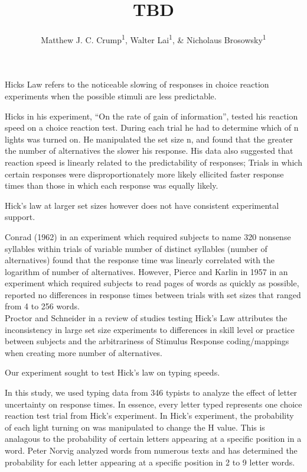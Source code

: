 \documentclass[man]{apa6}
\title{TBD}
\author{Matthew J. C. Crump\textsuperscript{1}, Walter Lai\textsuperscript{1}, \& Nicholaus Brosowsky\textsuperscript{1}}
\affiliation{
    \vspace{0.5cm}
          \textsuperscript{1} Brooklyn College of the City University of New York  }
\theoremstyle{definition}
\theoremstyle{definition}
\theoremstyle{definition}
\theoremstyle{remark}
\begin{document}
\maketitle

\setcounter{secnumdepth}{0}



Hicks Law refers to the noticeable slowing of responses in choice
reaction experiments when the possible stimuli are less predictable.

Hicks in his experiment, \enquote{On the rate of gain of information},
tested his reaction speed on a choice reaction test. During each trial
he had to determine which of n lights was turned on. He manipulated the
set size n, and found that the greater the number of alternatives the
slower his response. His data also suggested that reaction speed is
linearly related to the predictability of responses; Trials in which
certain responses were disproportionately more likely ellicited faster
response times than those in which each response was equally likely.

Hick's law at larger set sizes however does not have consistent
experimental support.

Conrad (1962) in an experiment which required subjects to name 320
nonsense syllables within trials of variable number of distinct
syllables (number of alternatives) found that the response time was
linearly correlated with the logarithm of number of alternatives.
However, Pierce and Karlin in 1957 in an experiment which required
subjects to read pages of words as quickly as possible, reported no
differences in response times between trials with set sizes that ranged
from 4 to 256 words.\\
Proctor and Schneider in a review of studies testing Hick's Law
attributes the inconsistency in large set size experiments to
differences in skill level or practice between subjects and the
arbitrariness of Stimulus Response coding/mappings when creating more
number of alternatives.

Our experiment sought to test Hick's law on typing speeds.

In this study, we used typing data from 346 typists to analyze the
effect of letter uncertainty on response times. In essence, every letter
typed represents one choice reaction test trial from Hick's experiment.
In Hick's experiment, the probability of each light turning on was
manipulated to change the H value. This is analagous to the probability
of certain letters appearing at a specific position in a word. Peter
Norvig analyzed words from numerous texts and has determined the
probability for each letter appearing at a specific position in 2 to 9
letter words.
\end{document}
